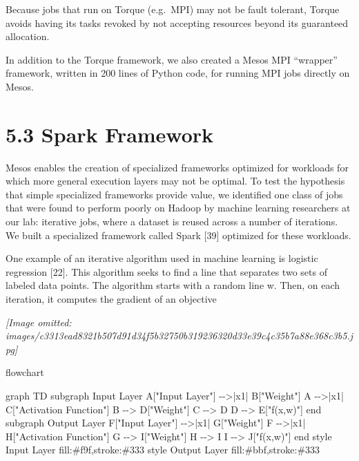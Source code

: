 \documentclass[
]{article}
\newenvironment{Shaded}{}{}
\newcommand{\NormalTok}[1]{#1}
\begin{document}
Because jobs that run on Torque (e.g.~MPI) may not be fault tolerant,
Torque avoids having its tasks revoked by not accepting resources beyond
its guaranteed allocation.

In addition to the Torque framework, we also created a Mesos MPI
``wrapper'' framework, written in 200 lines of Python code, for running
MPI jobs directly on Mesos.

\section{5.3 Spark Framework}\label{spark-framework}

Mesos enables the creation of specialized frameworks optimized for
workloads for which more general execution layers may not be optimal. To
test the hypothesis that simple specialized frameworks provide value, we
identified one class of jobs that were found to perform poorly on Hadoop
by machine learning researchers at our lab: iterative jobs, where a
dataset is reused across a number of iterations. We built a specialized
framework called Spark {[}39{]} optimized for these workloads.

One example of an iterative algorithm used in machine learning is
logistic regression {[}22{]}. This algorithm seeks to find a line that
separates two sets of labeled data points. The algorithm starts with a
random line w. Then, on each iteration, it computes the gradient of an
objective

\textit{[Image omitted: images/c3313ead8321b507d91d34f5b32750b319236320d33e39c4c35b7a88e368c3b5.jpg]}

flowchart

\begin{Shaded}
\begin{Highlighting}[]
\NormalTok{graph TD}
\NormalTok{    subgraph Input Layer}
\NormalTok{        A["Input Layer"] {-}{-}\textgreater{}|x1| B["Weight"]}
\NormalTok{        A {-}{-}\textgreater{}|x1| C["Activation Function"]}
\NormalTok{        B {-}{-}\textgreater{} D["Weight"]}
\NormalTok{        C {-}{-}\textgreater{} D}
\NormalTok{        D {-}{-}\textgreater{} E["f(x,w)"]}
\NormalTok{    end}
\NormalTok{    subgraph Output Layer}
\NormalTok{        F["Input Layer"] {-}{-}\textgreater{}|x1| G["Weight"]}
\NormalTok{        F {-}{-}\textgreater{}|x1| H["Activation Function"]}
\NormalTok{        G {-}{-}\textgreater{} I["Weight"]}
\NormalTok{        H {-}{-}\textgreater{} I}
\NormalTok{        I {-}{-}\textgreater{} J["f(x,w)"]}
\NormalTok{    end}
\NormalTok{    style Input Layer fill:\#f9f,stroke:\#333}
\NormalTok{    style Output Layer fill:\#bbf,stroke:\#333}
\end{Highlighting}
\end{Shaded}
\end{document}
